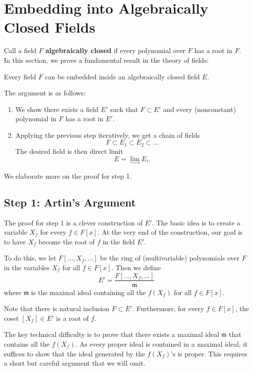 \section{Embedding into Algebraically Closed Fields}
Call a field $F$ \textbf{algebraically closed} if every polynomial over $F$ has a root in $F$. In this section, we prove a fundamental result in the theory of fields:
\begin{center}
    Every field $F$ can be embedded inside an algebraically closed field $E$.
\end{center}
The argument is as follows:
\begin{enumerate}
    \item We show there exists a field $E'$ such that $F \subset E'$ and every (nonconstant) polynomial in $F$ has a root in $E'$.

    \item Applying the previous step iteratively, we get a chain of fields
        \[
            F \subset E_1 \subset E_2 \subset \dots
        \]
        The desired field is then direct limit
        \[
            E = \lim_{\longrightarrow} E_i.
        \]
\end{enumerate}
We elaborate more on the proof for step 1.

\subsection{Step 1: Artin's Argument}
The proof for step 1 is a clever construction of $E'$. The basic idea is to create a variable $X_f$ for every $f \in F[x]$. At the very end of the construction, our goal is to have $X_f$ become the root of $f$ in the field $E'$.

To do this, we let $F[\dots, X_f, \dots]$ be the ring of (multivariable) polynomials over $F$ in the variables $X_f$ for all $f \in F[x]$. Then we define
\[
    E' = \frac{F[\dots, X_f, \dots]}{\mathfrak m}
\]
where $\mathfrak m$ is the maximal ideal containing all the $f(X_f)$ for all $f \in F[x]$.

Note that there is natural inclusion $F \subset E'$. Furthermore, for every $f \in F[x]$, the coset $[X_f] \in E'$ is a root of $f$.

The key technical difficulty is to prove that there exists a maximal ideal $\mathfrak m$ that contains all the $f(X_f)$. As every proper ideal is contained in a maximal ideal, it suffices to show that the ideal generated by the $f(X_f)$'s is proper. This requires a short but careful argument that we will omit.
